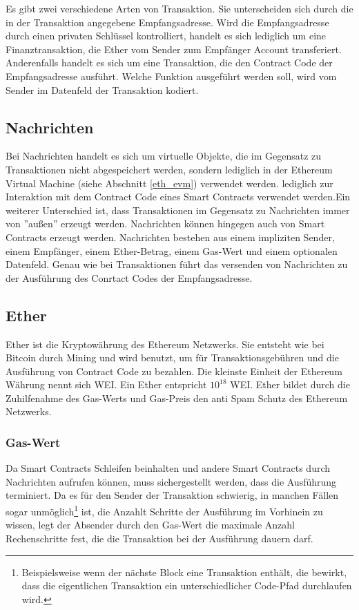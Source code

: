 Es gibt zwei verschiedene Arten von Transaktion. Sie unterscheiden sich durch die in der Transaktion angegebene Empfangsadresse. 
Wird die Empfangsadresse durch einen privaten Schlüssel kontrolliert, handelt es sich lediglich um eine Finanztransaktion, die Ether vom Sender zum Empfänger Account transferiert. Anderenfalls handelt es sich um eine Transaktion, die den Contract Code der Empfangsadresse ausführt. Welche Funktion ausgeführt werden soll, wird vom Sender im Datenfeld der Transaktion kodiert.

\subsection{Nachrichten}\label{eth_messages}
Bei Nachrichten handelt es sich um virtuelle Objekte, die im Gegensatz zu Transaktionen nicht abgespeichert werden, sondern lediglich in der Ethereum Virtual Machine (siehe Abschnitt \ref{eth_evm}) verwendet werden. \if lediglich zur Interaktion mit dem Contract Code eines Smart Contracts verwendet werden.\fi Ein weiterer Unterschied ist, dass Transaktionen im Gegensatz zu Nachrichten immer von ''außen'' erzeugt werden. Nachrichten können hingegen auch von Smart Contracts erzeugt werden. Nachrichten bestehen aus einem impliziten Sender, einem Empfänger, einem Ether-Betrag, einem Gas-Wert und einem optionalen Datenfeld. Genau wie bei Transaktionen führt das versenden von Nachrichten zu der Ausführung des Conrtact Codes der Empfangsadresse.

\subsection{Ether}\label{eth_ether} 
Ether ist die Kryptowährung des Ethereum Netzwerks. Sie entsteht wie bei Bitcoin durch Mining und wird benutzt, um für Transaktionsgebühren und die Ausführung von Contract Code zu bezahlen. Die kleinste Einheit der Ethereum Währung nennt sich WEI. Ein Ether entspricht $10^{18}$ WEI. Ether bildet durch die Zuhilfenahme des Gas-Werts und Gas-Preis den anti Spam Schutz des Ethereum Netzwerks.
\subsubsection{Gas-Wert}
Da Smart Contracts Schleifen beinhalten und andere Smart Contracts durch Nachrichten aufrufen können, muss sichergestellt werden, dass die Ausführung terminiert. Da es für den Sender der Transaktion schwierig, in manchen Fällen sogar unmöglich\footnote{Beispielsweise wenn der nächste Block eine Transaktion enthält, die bewirkt, dass die eigentlichen Transaktion ein unterschiedlicher Code-Pfad durchlaufen wird.} ist, die Anzahlt Schritte der Ausführung im Vorhinein zu wissen, legt der Absender durch den Gas-Wert die maximale Anzahl Rechenschritte fest, die die Transaktion bei der Ausführung dauern darf.
